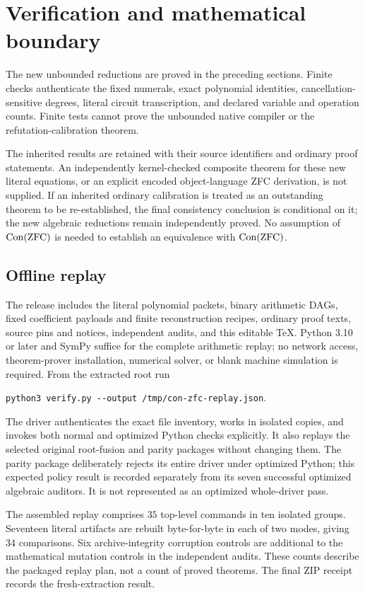 \section{Verification and mathematical boundary}
The new unbounded reductions are proved in the preceding sections. Finite
checks authenticate the fixed numerals, exact polynomial identities,
cancellation-sensitive degrees, literal circuit transcription, and declared
variable and operation counts. Finite tests cannot prove the unbounded
native compiler or the refutation-calibration theorem.

The inherited results are retained with their source identifiers and
ordinary proof statements. An independently kernel-checked composite theorem
for these new literal equations, or an explicit encoded object-language ZFC
derivation, is not supplied. If an inherited ordinary calibration is treated
as an outstanding theorem to be re-established, the final consistency
conclusion is conditional on it; the new algebraic reductions remain
independently proved. No assumption of $\operatorname{Con}(\mathrm{ZFC})$ is needed to establish
an equivalence with $\operatorname{Con}(\mathrm{ZFC})$.

\subsection{Offline replay}
The release includes the literal polynomial packets, binary arithmetic DAGs,
fixed coefficient payloads and finite reconstruction recipes, ordinary proof
texts, source pins and notices, independent audits, and this editable TeX.
Python 3.10 or later and SymPy suffice for the complete arithmetic replay;
no network access, theorem-prover installation, numerical solver, or blank
machine simulation is required. From the extracted root run
\begin{center}
\verb|python3 verify.py --output /tmp/con-zfc-replay.json|.
\end{center}
The driver authenticates the exact file inventory, works in isolated copies,
and invokes both normal and optimized Python checks explicitly. It also
replays the selected original root-fusion and parity packages without
changing them. The parity package deliberately rejects its entire driver
under optimized Python; this expected policy result is recorded separately
from its seven successful optimized algebraic auditors. It is not represented
as an optimized whole-driver pass.

The assembled replay comprises $35$ top-level commands in ten isolated
groups. Seventeen literal artifacts are rebuilt byte-for-byte in each of
two modes, giving $34$ comparisons. Six archive-integrity corruption controls
are additional to the mathematical mutation controls in the independent
audits. These counts describe the packaged replay plan, not a count of
proved theorems. The final ZIP receipt records the fresh-extraction result.

